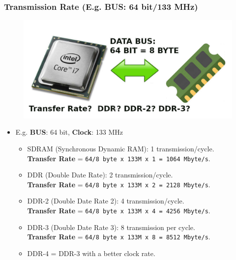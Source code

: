 \documentclass[xcolor=table, notheorems, hyperref={pdfpagelabels=false}]{beamer}
\begin{document}
\begin{frame}
\frametitle{Transmission Rate (E.g. \textbf{BUS}: 64 bit/133 MHz)}
\begin{figure}
\includegraphics[width=0.61\linewidth]{os-transfer-rate}
\end{figure}
\begin{itemize}
\item E.g. \textbf{BUS}: 64 bit, \textbf{Clock}: 133 MHz
\begin{itemize}
\item SDRAM (Synchronous Dynamic RAM): 1 transmission/cycle.\\
\textbf{Transfer Rate} = \texttt{64/8 byte x 133M x 1 = 1064 Mbyte/s}.
\item DDR (Double Date Rate): 2 transmission/cycle.\\
\textbf{Transfer Rate} = \texttt{64/8 byte x 133M x 2 = 2128 Mbyte/s}.
\item DDR-2 (Double Date Rate 2): 4 transmission/cycle.\\
\textbf{Transfer Rate} = \texttt{64/8 byte x 133M x 4 = 4256 Mbyte/s}.
\item DDR-3 (Double Date Rate 3): 8 transmission per cycle.\\
\textbf{Transfer Rate} = \texttt{64/8 byte x 133M x 8 = 8512 Mbyte/s}.
\item DDR-4 = DDR-3 with a better clock rate.
\end{itemize}
\end{itemize}
\end{frame}
\end{document}
